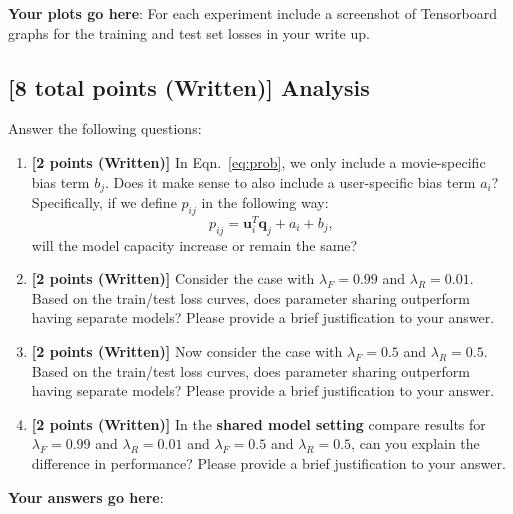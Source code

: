 \documentclass[12pt]{article}
\begin{document}
\noindent\textbf{Your plots go here}:
For each experiment include a screenshot of Tensorboard graphs for the training and test set losses in your write up.
\vspace{0.8cm}

\subsection{\textbf{[8 total points (Written)]} Analysis}
Answer the following questions:

\begin{enumerate}
    \item \textbf{[2 points (Written)]} In Eqn.~\ref{eq:prob}, we only include a movie-specific bias term $b_j$. Does it make sense to also include a user-specific bias term $a_i$? Specifically, if we define $p_{ij}$ in the following way:
    \begin{equation}
        p_{ij} = \mathbf{u}_i^T\mathbf{q}_j + a_i + b_j,
    \end{equation}
    will the model capacity increase or remain the same? 
    \item \textbf{[2 points (Written)]} Consider the case with $\lambda_F=0.99$ and $\lambda_R=0.01$. Based on the train/test loss curves, does parameter sharing outperform having separate models? Please provide a brief justification to your answer.
    
    \item \textbf{[2 points (Written)]} Now consider the case with $\lambda_F=0.5$ and $\lambda_R=0.5$.  Based on the train/test loss curves, does parameter sharing outperform having separate models? Please provide a brief justification to your answer.
    
    \item \textbf{[2 points (Written)]} In the \textbf{shared model setting} compare results for $\lambda_F=0.99$ and $\lambda_R=0.01$ and $\lambda_F=0.5$ and $\lambda_R=0.5$, can you explain the difference in performance? Please provide a brief justification to your answer.
\end{enumerate}

\noindent\textbf{Your answers go here}:
\vspace{0.8cm}


\newpage


\end{document}
